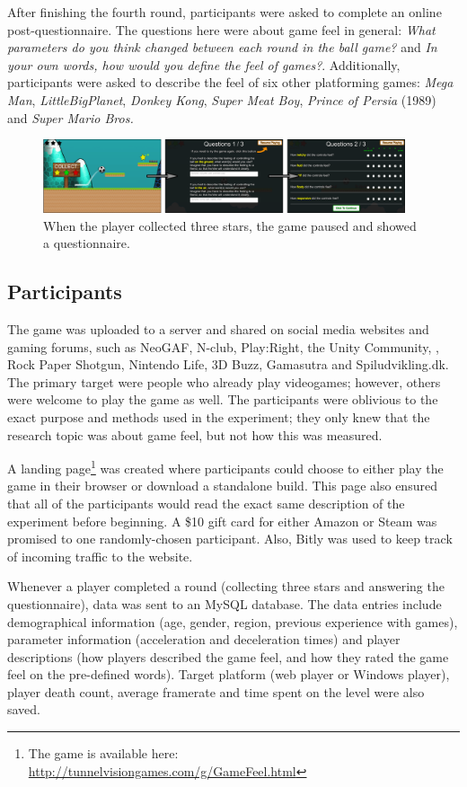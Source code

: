 After finishing the fourth round, participants were asked to complete an online post-questionnaire. The questions here were about game feel in general: \textit{What parameters do you think changed between each round in the ball game?} and \textit{In your own words, how would you define the feel of games?}. Additionally, participants were asked to describe the feel of six other platforming games: \textit{Mega Man}, \textit{LittleBigPlanet}, \textit{Donkey Kong}, \textit{Super Meat Boy}, \textit{Prince of Persia} (1989) and \textit{Super Mario Bros.}

\begin{figure}[htbp]
\centering
\includegraphics[width=0.95\textwidth]{Pics/game_phases}
\caption{When the player collected three stars, the game paused and showed a questionnaire.}
\label{fig:questionnaire}
\end{figure}

\subsection{Participants}
The game was uploaded to a server and shared on social media websites and gaming forums, such as NeoGAF, N-club, Play:Right, the Unity Community, , Rock Paper Shotgun, Nintendo Life, 3D Buzz, Gamasutra and Spiludvikling.dk. The primary target were people who already play videogames; however, others were welcome to play the game as well. The participants were oblivious to the exact purpose and methods used in the experiment; they only knew that the research topic was about game feel, but not how this was measured.

A landing page\footnote{The game is available here: \\ \url{http://tunnelvisiongames.com/g/GameFeel.html}} was created where participants could choose to either play the game in their browser or download a standalone build. This page also ensured that all of the participants would read the exact same description of the experiment before beginning. A \$10 gift card for either Amazon or Steam was promised to one randomly-chosen participant. Also, Bitly \cite{bitly} was used to keep track of incoming traffic to the website.

Whenever a player completed a round (collecting three stars and answering the questionnaire), data was  sent to an MySQL database. The data entries include demographical information (age, gender, region, previous experience with games), parameter information (acceleration and deceleration times) and player descriptions (how players described the game feel, and how they rated the game feel on the pre-defined words). Target platform (web player or Windows player), player death count, average framerate and time spent on the level were also saved.

